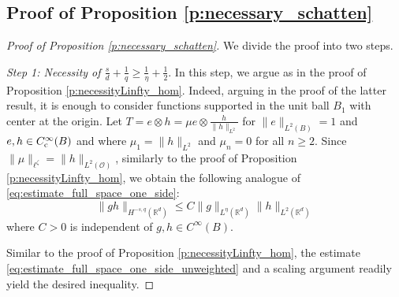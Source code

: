 \documentclass[reqno]{amsart}
\theoremstyle{plain}
\theoremstyle{remark}
\theoremstyle{plain}
\numberwithin{equation}{section}
\def\R{{\mathbb R}}
\newcommand{\Domm}{\mathcal{O}}
\newcommand{\1}{\one}
\begin{document}
\subsection{Proof of Proposition \ref{p:necessary_schatten}}
\label{ss:necessary_schatten_proof}

\begin{proof}[Proof of Proposition \ref{p:necessary_schatten}]
We divide the proof into two steps.

\smallskip

\emph{Step 1: Necessity of $\frac{s}{d} + \frac{1}{q} \geq  \frac{1}{\eta} +\frac12$}.
In this step, we argue as in the proof of Proposition \ref{p:necessityLinfty_hom}. 
Indeed, arguing in the proof of the latter result, it is enough to consider functions supported in the unit ball $B_1$ with center at the origin. Let $T = e\otimes h = \mu e\otimes \frac{h}{\|h\|_{L^2}}$ for $\|e\|_{L^2(B)}=1$ and $e,h\in C^\infty_{{\rm c}}(B)$ and where $\mu_1 = \|h\|_{L^2}$ and $\mu_n=0$ for all $n\geq 2$. 
Since $\|\mu\|_{\ell^\zeta}=\|h\|_{L^2(\Domm)}$, similarly to the proof of Proposition \ref{p:necessityLinfty_hom}, we obtain the following analogue of \eqref{eq:estimate_full_space_one_side}:
\begin{equation}
\label{eq:estimate_full_space_one_side_unweighted}
\|g h\|_{H^{-s,q}(\R^d)}\leq C\|g\|_{L^\eta(\R^d)} \|h\|_{L^2(\R^d)}
\end{equation}
where $C>0$ is independent of $g,h\in C^\infty(B)$.

Similar to the proof of Proposition \ref{p:necessityLinfty_hom}, the estimate \eqref{eq:estimate_full_space_one_side_unweighted} and a scaling argument readily yield the desired inequality.

\smallskip


\end{proof}
\end{document}
